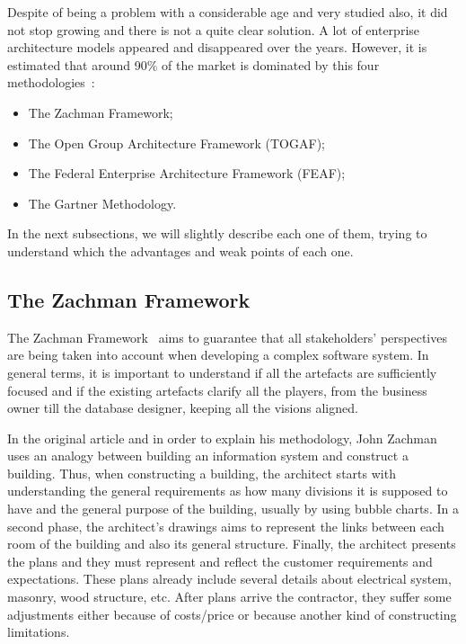 Despite of being a problem with a considerable age and very studied also, it did not stop growing and there is not a quite clear solution. A lot of enterprise architecture models appeared and disappeared over the years. However, it is estimated that around 90\% of the market is dominated by this four methodologies~\citep{Sessions2007}:

\begin{itemize}
\item The Zachman Framework;
\item The Open Group Architecture Framework (TOGAF);
\item The Federal Enterprise Architecture Framework (FEAF);
\item The Gartner Methodology. %
\end{itemize}

In the next subsections, we will slightly describe each one of them, trying to understand which the advantages and weak points of each one. 











\subsection{The Zachman Framework} \label{sec:zachman-fw}

The Zachman Framework~\citep{Zachman1987} aims to guarantee that all stakeholders' perspectives are being taken into account when developing a complex software system. In general terms, it is important to understand if all the artefacts are sufficiently focused and if the existing artefacts clarify all the players, from the business owner till the database designer, keeping all the visions aligned.

In the original article and in order to explain his methodology, John Zachman uses an analogy between building an information system and construct a building. Thus, when constructing a building, the architect starts with understanding the general requirements as how many divisions it is supposed to have and the general purpose of the building, usually by using bubble charts. In a second phase, the architect's drawings aims to represent the links between each room of the building and also its general structure. Finally, the architect presents the plans and they must represent and reflect the customer requirements and expectations. These plans already include several details about electrical system, masonry, wood structure, etc. After plans arrive the contractor, they suffer some adjustments either because of costs/price or because another kind of constructing limitations.

